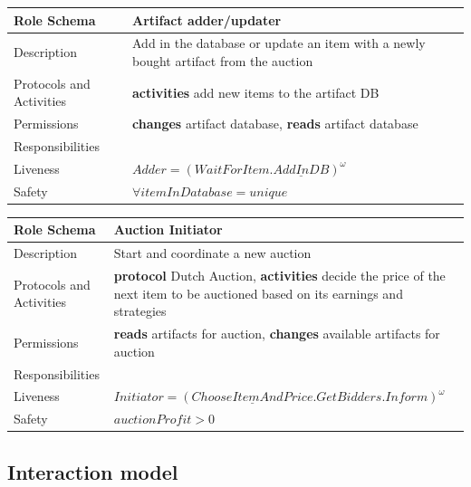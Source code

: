 \documentclass[a4paper, 11pt]{article}
\begin{document}
\begin{table}[H]
	\label{my-label}
	\begin{tabular}{l p{7cm}}
		\hline
		Role Schema              & Artifact adder/updater \\
		\hline
		Description              & Add in the database or update an item with a newly bought artifact from the auction \\
		Protocols and Activities & \textbf{activities} add new items to the artifact DB \\
		Permissions              & \textbf{changes} artifact database, \textbf{reads} artifact database \\
		\hline
		Responsibilities         &                   \\
		Liveness                 & \(Adder=(WaitForItem.\underline{AddInDB})^\omega \) \\
		Safety                   & \(\forall itemInDatabase = unique \) \\
		\hline
	\end{tabular}
\end{table}

\begin{table}[H]
	\label{my-label}
	\begin{tabular}{l p{7cm}}
		\hline
		Role Schema              & Auction Initiator \\
		\hline
		Description              & Start and coordinate a new auction \\
		Protocols and Activities & \textbf{protocol} Dutch Auction, \textbf{activities} decide the price of the next item to be auctioned based on its earnings and strategies \\
		Permissions              & \textbf{reads} artifacts for auction, \textbf{changes} available artifacts for auction \\
		\hline
		Responsibilities         &                   \\
		Liveness                 & \(Initiator=(\underline{ChooseItemAndPrice}.GetBidders.Inform)^\omega \) \\
		Safety                   & \(auctionProfit > 0  \) \\
		\hline
	\end{tabular}
\end{table}

\subsection{Interaction model}
\end{document}
